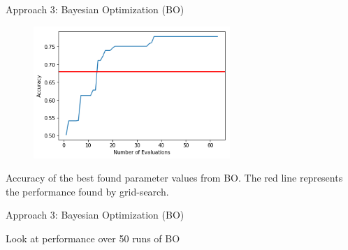 \documentclass{beamer}
\begin{document}
\begin{frame}{Approach 3: Bayesian Optimization (BO)}
	\begin{block}{}
		\begin{figure}[h]
			\begin{center}
				\includegraphics[height=5cm]{single_BO}
			\end{center}
		\end{figure}
		Accuracy of the best found parameter values from BO. The red line represents the performance found by grid-search.
	\end{block}
\end{frame}
\begin{frame}{Approach 3: Bayesian Optimization (BO)}
			\begin{block}{}
		Look at performance over 50 runs of BO
		
		\begin{figure}[h]
			\begin{center}
			\end{center}
		\end{figure}
	\end{block}
\end{frame}
\end{document}
